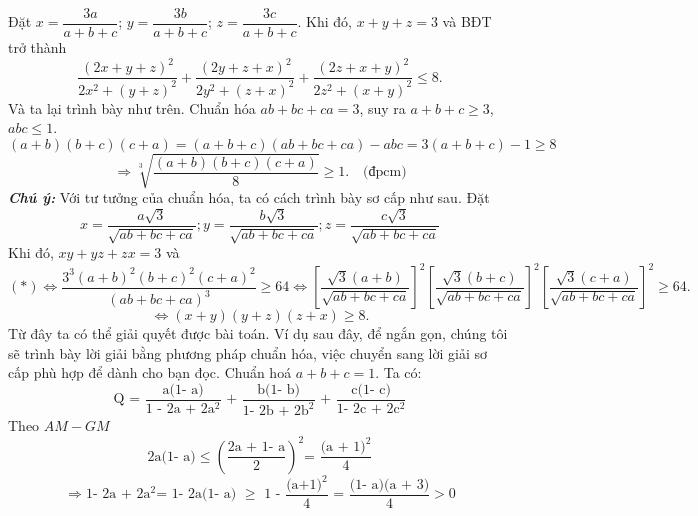 Đặt $x=\dfrac{3a}{a+b+c}$; $y=\dfrac{3b}{a+b+c}$; $z=\dfrac{3c}{a+b+c}$. Khi đó, $x+y+z=3$ và BĐT trở thành
$$\frac{{{\left( 2x+y+z \right)}^{2}}}{2{{x}^{2}}+{{\left( y+z \right)}^{2}}}+\frac{{{\left( 2y+z+x \right)}^{2}}}{2{{y}^{2}}+{{\left( z+x \right)}^{2}}}+\frac{{{\left( 2z+x+y \right)}^{2}}}{2{{z}^{2}}+{{\left( x+y \right)}^{2}}}\le 8.$$
Và ta lại trình bày như trên.
\hda  Chuẩn hóa $ab+bc+ca=3$, suy ra $a+b+c\ge 3$, $abc\le 1$.
\[\left( a+b \right)\left( b+c \right)\left( c+a \right)=\left( a+b+c \right)\left( ab+bc+ca \right)-abc=3\left( a+b+c \right)-1\ge 8\]
\[\Rightarrow \sqrt[3]{\frac{\left( a+b \right)\left( b+c \right)\left( c+a \right)}{8}}\ge 1.\quad \text{(đpcm)}\]
\textbf{\textit{Chú ý:}} Với tư tưởng của chuẩn hóa, ta có cách trình bày sơ cấp như sau. Đặt
\[x=\frac{a\sqrt{3}}{\sqrt{ab+bc+ca}};y=\frac{b\sqrt{3}}{\sqrt{ab+bc+ca}};z=\frac{c\sqrt{3}}{\sqrt{ab+bc+ca}}\]
Khi đó, $xy+yz+zx=3$ và
\[\left( * \right)\Leftrightarrow \frac{{{3}^{3}}{{\left( a+b \right)}^{2}}{{\left( b+c \right)}^{2}}{{\left( c+a \right)}^{2}}}{{{\left( ab+bc+ca \right)}^{3}}}\ge 64\Leftrightarrow {{\left[ \frac{\sqrt{3}\left( a+b \right)}{\sqrt{ab+bc+ca}} \right]}^{2}}{{\left[ \frac{\sqrt{3}\left( b+c \right)}{\sqrt{ab+bc+ca}} \right]}^{2}}{{\left[ \frac{\sqrt{3}\left( c+a \right)}{\sqrt{ab+bc+ca}} \right]}^{2}}\ge 64.\]
 \[\Longleftrightarrow\left( x+y \right)\left( y+z \right)\left( z+x \right)\ge 8.\]
Từ đây ta có thể giải quyết được bài toán. Ví dụ sau đây, để ngắn gọn, chúng tôi sẽ trình bày lời giải bằng phương pháp chuẩn hóa, việc chuyển sang lời giải sơ cấp phù hợp để dành cho bạn đọc.
\hda  Chuẩn hoá $a+b+c=1$. Ta có:
\[\text{Q = }\frac{\text{a(1- a)}}{\text{1 - 2a + 2}{{\text{a}}^{\text{2}}}}\text{ + }\frac{\text{b(1- b)}}{\text{1- 2b + 2}{{\text{b}}^{\text{2}}}}\text{ + }\frac{\text{c(1- c)}}{\text{1- 2c + 2}{{\text{c}}^{\text{2}}}}\]
Theo $AM-GM$
\[\text{2a(1- a)}\le {{\left( \frac{\text{2a + 1- a}}{\text{2}} \right)}^{\text{2}}}\text{= }\frac{{{\text{(a + 1)}}^{\text{2}}}}{\text{4}}\]
\[\Rightarrow \text{1- 2a + 2}{{\text{a}}^{\text{2}}}\text{= 1- 2a(1- a) }\ge \text{ 1 - }\frac{{{\text{(a+1)}}^{\text{2}}}}{\text{4}}\text{ = }\frac{\text{(1- a)(a + 3)}}{\text{4}}>0\]
